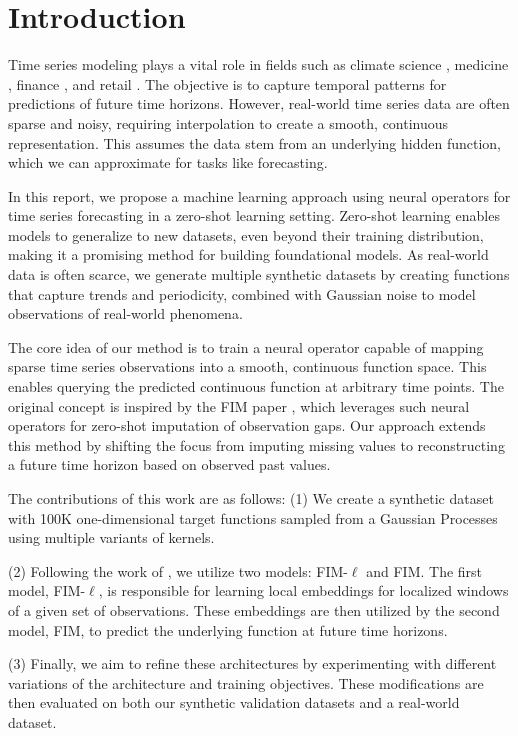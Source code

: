 \documentclass{article}
\theoremstyle{plain}
\theoremstyle{definition}
\theoremstyle{remark}
\begin{document}
\section{Introduction}

Time series modeling plays a vital role in fields such as climate science \cite{climate}, medicine \cite{medicine}, finance \cite{finance}, and retail \cite{retail}. The objective is to capture temporal patterns for predictions of future time horizons. However, real-world time series data are often sparse and noisy, requiring interpolation to create a smooth, continuous representation. This assumes the data stem from an underlying hidden function, which we can approximate for tasks like forecasting.

In this report, we propose a machine learning approach using neural operators for time series forecasting in a zero-shot learning setting.
Zero-shot learning enables models to generalize to new datasets, even beyond their training distribution, making it a promising method for building foundational models. 
As real-world data is often scarce, we generate multiple synthetic datasets by creating functions that capture trends and periodicity, combined with Gaussian noise to model observations of real-world phenomena.

The core idea of our method is to train a neural operator capable of mapping sparse time series observations into a smooth, continuous function space. This enables querying the predicted continuous function at arbitrary time points. The original concept is inspired by the FIM paper \cite{fim-l}, which leverages such neural operators for zero-shot imputation of observation gaps. Our approach extends this method by shifting the focus from imputing missing values to reconstructing a future time horizon based on observed past values.

The contributions of this work are as follows: (1) We create a synthetic dataset with 100K one-dimensional target functions sampled from a Gaussian Processes using multiple variants of kernels.

(2) Following the work of \cite{fim-l}, we utilize two models: FIM-$\ell$ and FIM. The first model, FIM-$\ell$, is responsible for learning local embeddings for localized windows of a given set of observations. These embeddings are then utilized by the second model, FIM, to predict the underlying function at future time horizons.

 (3) Finally, we aim to refine these architectures by experimenting with different variations of the architecture and training objectives. These modifications are then evaluated on both our synthetic validation datasets and a real-world dataset.
\end{document}
